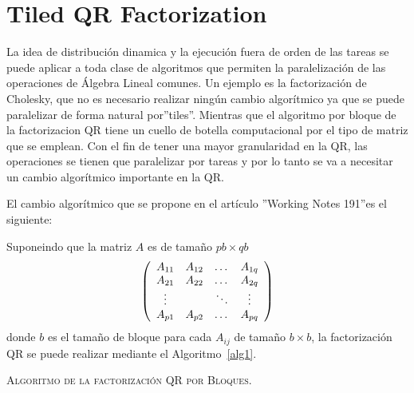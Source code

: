 \documentclass[12pt]{article}
\begin{document}

\section{Tiled QR Factorization}
\label{sec:tiled}

La idea de distribución dinamica y la ejecución fuera de orden de las tareas se puede aplicar a toda clase de algoritmos que permiten la paralelización de las operaciones de Álgebra Lineal comunes. Un ejemplo es la factorización de Cholesky, que no es necesario realizar ningún cambio algorítmico ya que se puede paralelizar de forma natural por''tiles''. Mientras que el algoritmo por bloque de la factorizacion QR tiene un cuello de botella computacional por el tipo de matriz que se emplean. Con el fin de tener una mayor granularidad en la QR, las operaciones se tienen que paralelizar por tareas y por lo tanto se va a necesitar un cambio algorítmico importante en la QR. 

El cambio algorítmico que se propone en el artículo ''Working Notes 191''es el siguiente:



Suponeindo que la matriz $A$ es de tamaño $pb \times qb$
\begin{displaymath}
  \left(\begin{array}[!h]{cccc}
    A_{11}  & A_{12} & \dots  & A_{1q}  \\
    A_{21}  & A_{22} & \dots  & A_{2q}  \\
    \vdots &       & \ddots & \vdots \\
    A_{p1}  & A_{p2} & \dots  & A_{pq}
  \end{array}\right)
\end{displaymath}
donde $b$ es el tamaño de bloque para cada $A_{ij}$ de tamaño $b \times b$, la factorización QR se puede realizar mediante el Algoritmo~\ref{alg1}.

\begin{algorithm}[H]
   \SetAlgoLined
   		
   \label{alg1}
   \caption{\textsc{Algoritmo de la factorización QR por Bloques.}}
\end{algorithm}
\end{document}
